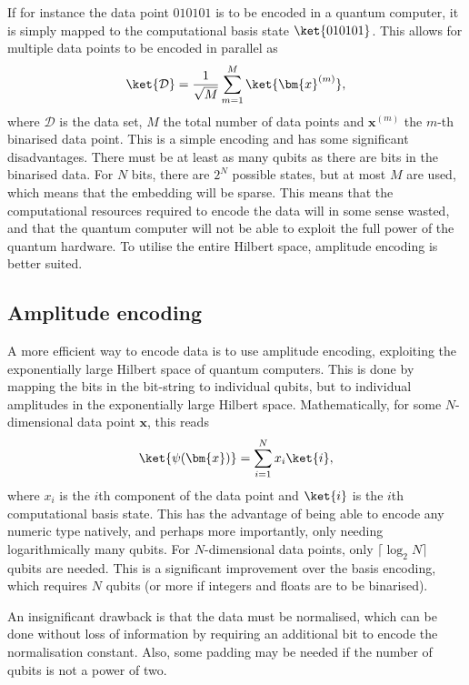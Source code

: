 If for instance the data point $010101$ is to be encoded in a quantum computer, it is simply mapped to the computational basis state $\ket{010101}$.
This allows for multiple data points to be encoded in parallel as
\begin{equation}
    \ket{\mathcal{D}} = \frac{1}{\sqrt M} \sum_{m=1}^M \ket{\bm{x}^{(m)}},
\end{equation}
where $\mathcal{D}$ is the data set, $M$ the total number of data points and $\bm{x}^{(m)}$ the $m$-th binarised data point.
This is a simple encoding and has some significant disadvantages.
There must be at least as many qubits as there are bits in the binarised data.
For $N$ bits, there are $2^N$ possible states, but at most $M$ are used, which means that the embedding will be sparse.
This means that the computational resources required to encode the data will in some sense wasted, and that the quantum computer will not be able to exploit the full power of the quantum hardware.
To utilise the entire Hilbert space, amplitude encoding is better suited.

\subsection{Amplitude encoding}
A more efficient way to encode data is to use amplitude encoding, exploiting the exponentially large Hilbert space of quantum computers.
This is done by mapping the bits in the bit-string to individual qubits, but to individual amplitudes in the exponentially large Hilbert space.
Mathematically, for some $N$-dimensional data point $\bm{x}$, this reads
\begin{equation}
    \ket{\psi(\bm{x})} = \sum_{i=1}^{N} x_i \ket{i},
\end{equation}
where $x_i$ is the $i$th component of the data point and $\ket{i}$ is the $i$th computational basis state.
This has the advantage of being able to encode any numeric type natively, and perhaps more importantly, only needing logarithmically many qubits.
For $N$-dimensional data points, only $\lceil \log_2 N \rceil$ qubits are needed.
This is a significant improvement over the basis encoding, which requires $N$ qubits (or more if integers and floats are to be binarised).

An insignificant drawback is that the data must be normalised, which can be done without loss of information by requiring an additional bit to encode the normalisation constant.
Also, some padding may be needed if the number of qubits is not a power of two.

